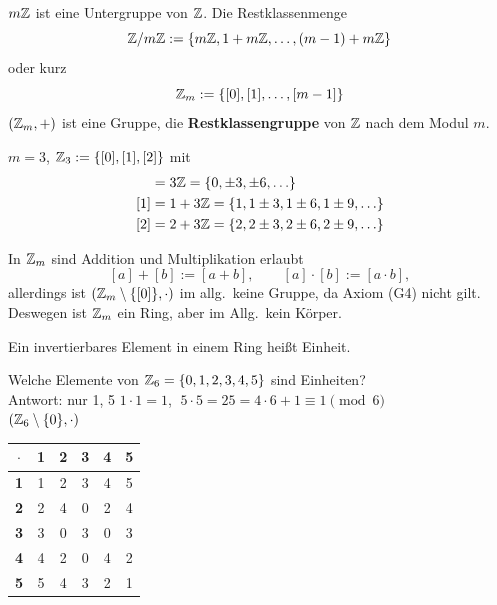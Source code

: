 \begin{definition}[Restklassengruppe]
$m\mathbb{Z}$ ist eine Untergruppe von $\mathbb{Z}$. Die Restklassenmenge
\[ \mathbb{Z} / m\mathbb{Z} := \{ m\mathbb{Z}, 1 + m\mathbb{Z}, \ldots, (m-1) + m\mathbb{Z} \} \]
oder kurz
\[ \mathbb{Z}_{m} := \{ [0], [1], \ldots, [m-1] \} \]
$(\mathbb{Z}_{m}, +)$ ist eine Gruppe, die \textbf{Restklassengruppe} von $\mathbb{Z}$ nach dem Modul $m$.
\end{definition}

\begin{beispiel}
$m = 3$, $\mathbb{Z}_{3} := \{ [0], [1], [2] \}$ mit
\begin{align*}
[0] &= 3\Z = \{ 0, \pm 3, \pm 6, \ldots \} \\
[1] &= 1 + 3\Z = \{ 1, 1 \pm 3, 1 \pm 6, 1 \pm 9, \ldots \} \\
[2] &= 2 + 3\Z = \{ 2, 2 \pm 3, 2 \pm 6, 2 \pm 9, \ldots \}
\end{align*}
\end{beispiel}

In $\mathbb{Z}_{m}$ sind Addition und Multiplikation erlaubt
\[ [a] + [b] := [a + b], \qquad [a] \cdot [b] := [a \cdot b], \]
allerdings ist $(\mathbb{Z}_{m} \setminus \{[0]\}, \cdot)$ im allg.\ keine Gruppe, da Axiom (G4) nicht gilt.\\
Deswegen ist $\mathbb{Z}_{m}$ ein Ring, aber im Allg.\ kein Körper.

\begin{definition}
Ein invertierbares Element in einem Ring heißt Einheit.
\end{definition}

\begin{beispiel}
Welche Elemente von $\mathbb{Z}_{6} = \{ 0, 1, 2, 3, 4, 5 \}$ sind Einheiten?\\
Antwort: nur 1, 5 \qquad $1 \cdot 1 = 1$, $\;5 \cdot 5 = 25 = 4 \cdot 6 + 1 \equiv 1 \pmod{6}$\\[1ex]
$(\mathbb{Z}_{6} \setminus \{0\}, \cdot)$
\begin{center}
\begin{tabular}{|c|c|c|c|c|c|}
\hline
$\cdot$ & \textbf{1} & \textbf{2} & \textbf{3} & \textbf{4} & \textbf{5} \\ \hline
\textbf{1} & 1 & 2 & 3 & 4 & 5 \\ \hline
\textbf{2} & 2 & 4 & 0 & 2 & 4 \\ \hline
\textbf{3} & 3 & 0 & 3 & 0 & 3 \\ \hline
\textbf{4} & 4 & 2 & 0 & 4 & 2 \\ \hline
\textbf{5} & 5 & 4 & 3 & 2 & 1 \\ \hline
\end{tabular}
\end{center}
\end{beispiel}

